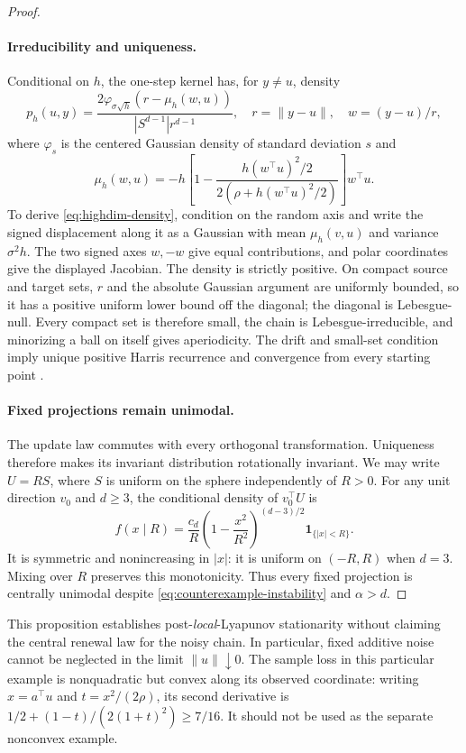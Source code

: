 \begin{proof}
\paragraph{Irreducibility and uniqueness.}
Conditional on $h$, the one-step kernel has, for $y\ne u$, density
\begin{equation}
 p_h(u,y)=\frac{2\varphi_{\sigma\sqrt h}(r-\mu_h(w,u))}
 {|S^{d-1}|r^{d-1}},
 \quad r=\|y-u\|,\quad w=(y-u)/r,
 \label{eq:highdim-density}
\end{equation}
where $\varphi_s$ is the centered Gaussian density of standard
deviation $s$ and
\[
 \mu_h(w,u)=-h\left[1-
 \frac{h(w^\top u)^2/2}{2(\rho+h(w^\top u)^2/2)}\right]w^\top u.
\]
To derive \eqref{eq:highdim-density}, condition on the random axis and
write the signed displacement along it as a Gaussian with mean
$\mu_h(v,u)$ and variance $\sigma^2h$. The two signed axes $w,-w$
give equal contributions, and polar coordinates give the displayed
Jacobian. The density is strictly positive. On compact source and
target sets, $r$ and the absolute Gaussian argument are uniformly
bounded, so it has a positive uniform lower bound off the diagonal;
the diagonal is Lebesgue-null. Every compact set is therefore small,
the chain is Lebesgue-irreducible, and minorizing a ball on itself gives
aperiodicity. The drift and small-set condition imply unique positive
Harris recurrence and convergence from every starting point
\citep{hairermattingly2011}.

\paragraph{Fixed projections remain unimodal.}
The update law commutes with every orthogonal transformation.
Uniqueness therefore makes its invariant distribution rotationally
invariant. We may write $U=RS$, where $S$ is uniform on the sphere
independently of $R>0$. For any unit direction $v_0$ and $d\ge3$,
the conditional density of $v_0^\top U$ is
\begin{equation}
 f(x\mid R)=\frac{c_d}{R}
 \left(1-\frac{x^2}{R^2}\right)^{(d-3)/2}
 {\mathbf 1}_{\{|x|<R\}}.
 \label{eq:projection-mixture}
\end{equation}
It is symmetric and nonincreasing in $|x|$: it is uniform on
$(-R,R)$ when $d=3$. Mixing over $R$ preserves this monotonicity.
Thus every fixed projection is centrally unimodal despite
\eqref{eq:counterexample-instability} and $\alpha>d$.
\end{proof}

This proposition establishes post-\emph{local}-Lyapunov stationarity
without claiming the central renewal law for the noisy chain. In
particular, fixed additive noise cannot be neglected in the limit
$\|u\|\downarrow0$. The sample loss in this particular example is
nonquadratic but convex along its observed coordinate: writing
$x=a^\top u$ and $t=x^2/(2\rho)$, its second derivative is
$1/2+(1-t)/(2(1+t)^2)\ge7/16$.
It should not be used as the separate nonconvex example.
